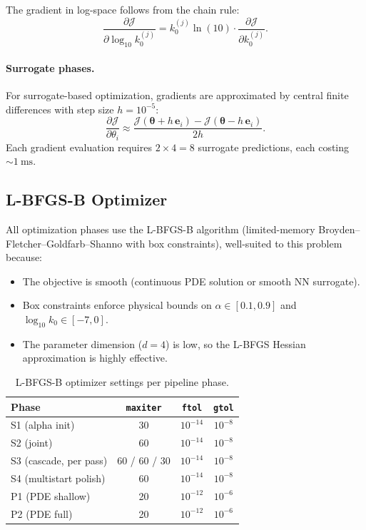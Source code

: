 \documentclass[11pt,a4paper]{article}
\newcommand{\vect}[1]{\boldsymbol{#1}}
\newcommand{\Jobj}{\mathcal{J}}
\begin{document}
The gradient in log-space follows from the chain rule:
\begin{equation}\label{eq:loggradient}
  \frac{\partial \Jobj}{\partial \log_{10} k_0^{(j)}}
  = k_0^{(j)} \ln(10) \cdot \frac{\partial \Jobj}{\partial k_0^{(j)}}.
\end{equation}

\paragraph{Surrogate phases.}
For surrogate-based optimization, gradients are approximated by central
finite differences with step size $h = 10^{-5}$:
\begin{equation}\label{eq:fd_grad}
  \frac{\partial \Jobj}{\partial \theta_i}
  \approx \frac{\Jobj(\vect{\theta} + h\,\vect{e}_i) - \Jobj(\vect{\theta} - h\,\vect{e}_i)}{2h}.
\end{equation}
Each gradient evaluation requires $2 \times 4 = 8$ surrogate predictions,
each costing $\sim\!\SI{1}{\milli\second}$.

\subsection{L-BFGS-B Optimizer}\label{sec:lbfgsb}

All optimization phases use the L-BFGS-B algorithm (limited-memory
Broyden--Fletcher--Goldfarb--Shanno with box constraints), well-suited to
this problem because:
\begin{itemize}
  \item The objective is smooth (continuous PDE solution or smooth NN
    surrogate).
  \item Box constraints enforce physical bounds on $\alpha \in [0.1, 0.9]$
    and $\log_{10} k_0 \in [-7, 0]$.
  \item The parameter dimension ($d=4$) is low, so the L-BFGS Hessian
    approximation is highly effective.
\end{itemize}

\begin{table}[H]
\centering
\caption{L-BFGS-B optimizer settings per pipeline phase.}
\label{tab:lbfgsb}
\begin{tabular}{lccc}
\toprule
Phase & \texttt{maxiter} & \texttt{ftol} & \texttt{gtol} \\
\midrule
S1 (alpha init) & 30 & $10^{-14}$ & $10^{-8}$ \\
S2 (joint) & 60 & $10^{-14}$ & $10^{-8}$ \\
S3 (cascade, per pass) & 60 / 60 / 30 & $10^{-14}$ & $10^{-8}$ \\
S4 (multistart polish) & 60 & $10^{-14}$ & $10^{-8}$ \\
P1 (PDE shallow) & 20 & $10^{-12}$ & $10^{-6}$ \\
P2 (PDE full) & 20 & $10^{-12}$ & $10^{-6}$ \\
\bottomrule
\end{tabular}
\end{table}
\end{document}
